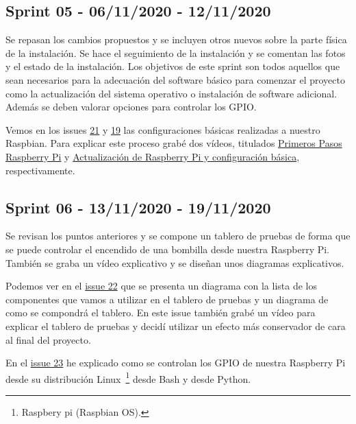 \subsection{Sprint 05 - 06/11/2020 - 12/11/2020}
Se repasan los cambios propuestos y se incluyen otros nuevos sobre la parte física de la instalación. Se hace el seguimiento de la instalación y se comentan las fotos y el estado de la instalación.
Los objetivos de este sprint son todos aquellos que sean necesarios para la adecuación del software básico para comenzar el proyecto como la actualización del sistema operativo o instalación de software adicional. Además se deben valorar opciones para controlar los GPIO.

\item Vemos en los issues \href{https://github.com/davidelinformatico/TFG/issues/21}{21} y \href{https://github.com/davidelinformatico/TFG/issues/19}{19} las configuraciones básicas realizadas a nuestro Raspbian. Para explicar este proceso grabé dos vídeos, titulados \href{https://youtu.be/B8E6q1fLp7Q}{Primeros Pasos Raspberry Pi} y \href{https://youtu.be/Vz38sGYpcYQ}{Actualización de Raspberry Pi y configuración básica}, respectivamente.

\subsection{Sprint 06 - 13/11/2020 - 19/11/2020}
Se revisan los puntos anteriores y se compone un tablero de pruebas de forma que se puede controlar el encendido de una bombilla desde nuestra Raspberry Pi. También se graba un vídeo explicativo y se diseñan unos diagramas explicativos.

Podemos ver en el \href{https://github.com/davidelinformatico/TFG/issues/22}{issue 22} que se presenta un diagrama con la lista de los componentes que vamos a utilizar en el tablero de pruebas y un diagrama de como se compondrá el tablero. En este issue también grabé un vídeo para explicar el tablero de pruebas y decidí utilizar un efecto más conservador de cara al final del proyecto.

En el \href{https://github.com/davidelinformatico/TFG/issues/23}{issue 23} he explicado como se controlan los GPIO de nuestra Raspberry Pi desde su distribución Linux~\footnote{Raspbery pi (Raspbian OS).} desde Bash y desde Python.

